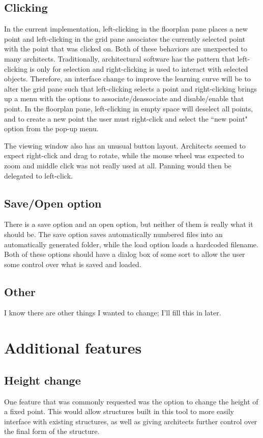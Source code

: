 \documentclass{thesis}
\begin{document}
\subsection{Clicking}
In the current implementation, left-clicking in the floorplan pane places a new point and left-clicking in the grid pane associates
the currently selected point with the point that was clicked on.  Both of these behaviors are unexpected to many architects.
Traditionally, architectural software has the pattern that left-clicking is only for selection and right-clicking is used to interact
with selected objects.  Therefore, an interface change to improve the learning curve will be to alter the grid pane such that
left-clicking selects a point and right-clicking brings up a menu with the options to associate/deassociate and disable/enable that
point.  In the floorplan pane, left-clicking in empty space will deselect all points, and to create a new point the user must
right-click and select the ``new point" option from the pop-up menu.

The viewing window also has an unusual button layout.  Architects seemed to expect right-click and drag to rotate, while the mouse
wheel was expected to zoom and middle click was not really used at all.  Panning would then be delegated to left-click.

\subsection{Save/Open option}
There is a save option and an open option, but neither of them is really what it should be.  The save option saves automatically
numbered files into an automatically generated folder, while the load option loads a hardcoded filename.  Both of these options
should have a dialog box of some sort to allow the user some control over what is saved and loaded.

\subsection{Other}
I know there are other things I wanted to change; I'll fill this in later.

\section{Additional features}

\subsection{Height change}
One feature that was commonly requested was the option to change the height of a fixed point.  This would allow structures built
in this tool to more easily interface with existing structures, as well as giving architects further control over the final form
of the structure.
\end{document}
